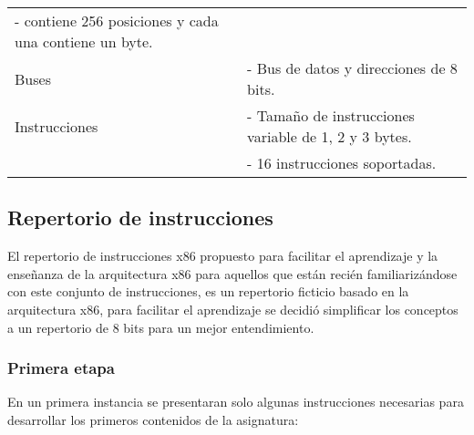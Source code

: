 \documentclass[12pt,twoside]{templates/unerthesis}
\begin{document}
\begin{longtable}[]{@{}ll@{}}
\begin{minipage}[t]{0.47\columnwidth}
- contiene 256 posiciones y cada una contiene un byte.\strut
\end{minipage}\tabularnewline
\begin{minipage}[t]{0.47\columnwidth}\raggedright
Buses\strut
\end{minipage} & \begin{minipage}[t]{0.47\columnwidth}\raggedright
- Bus de datos y direcciones de 8 bits.\strut
\end{minipage}\tabularnewline
\begin{minipage}[t]{0.47\columnwidth}\raggedright
Instrucciones\strut
\end{minipage} & \begin{minipage}[t]{0.47\columnwidth}\raggedright
- Tamaño de instrucciones variable de 1, 2 y 3 bytes.\strut
\end{minipage}\tabularnewline
\begin{minipage}[t]{0.47\columnwidth}\raggedright
\strut
\end{minipage} & \begin{minipage}[t]{0.47\columnwidth}\raggedright
- 16 instrucciones soportadas.\strut
\end{minipage}\tabularnewline
\bottomrule
\end{longtable}

\hypertarget{repertorio-de-instrucciones-1}{%
\subsection{Repertorio de instrucciones}\label{repertorio-de-instrucciones-1}}

El repertorio de instrucciones x86 propuesto para facilitar el aprendizaje y la enseñanza de la arquitectura x86 para aquellos que están recién familiarizándose con este conjunto de instrucciones, es un repertorio ficticio basado en la arquitectura x86, para facilitar el aprendizaje se decidió simplificar los conceptos a un repertorio de 8 bits para un mejor entendimiento.

\hypertarget{primera-etapa}{%
\subsubsection{Primera etapa}\label{primera-etapa}}

En un primera instancia se presentaran solo algunas instrucciones necesarias para desarrollar los primeros contenidos de la asignatura:
\end{document}
